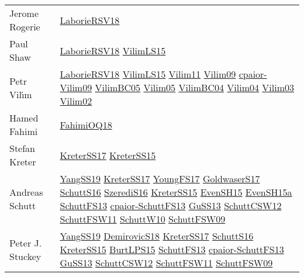 {\begin{longtable}{p{4cm}p{15cm}}
Jerome Rogerie & \href{articles/LaborieRSV18.pdf}{LaborieRSV18}\cite{LaborieRSV18} \\
Paul Shaw & \href{articles/LaborieRSV18.pdf}{LaborieRSV18}\cite{LaborieRSV18} \href{papers/VilimLS15.pdf}{VilimLS15}\cite{VilimLS15} \\
Petr Vil{\'{\i}}m & \href{articles/LaborieRSV18.pdf}{LaborieRSV18}\cite{LaborieRSV18} \href{papers/VilimLS15.pdf}{VilimLS15}\cite{VilimLS15} \href{papers/Vilim11.pdf}{Vilim11}\cite{Vilim11} \href{papers/Vilim09.pdf}{Vilim09}\cite{Vilim09} \href{papers/cpaior-Vilim09.pdf}{cpaior-Vilim09}\cite{cpaior-Vilim09} \href{articles/VilimBC05.pdf}{VilimBC05}\cite{VilimBC05} \href{papers/Vilim05.pdf}{Vilim05}\cite{Vilim05} \href{papers/VilimBC04.pdf}{VilimBC04}\cite{VilimBC04} \href{papers/Vilim04.pdf}{Vilim04}\cite{Vilim04} \href{papers/Vilim03.pdf}{Vilim03}\cite{Vilim03} \href{papers/Vilim02.pdf}{Vilim02}\cite{Vilim02} \\
Hamed Fahimi & \href{articles/FahimiOQ18.pdf}{FahimiOQ18}\cite{FahimiOQ18} \\
Stefan Kreter & \href{articles/KreterSS17.pdf}{KreterSS17}\cite{KreterSS17} \href{papers/KreterSS15.pdf}{KreterSS15}\cite{KreterSS15} \\
Andreas Schutt & \href{papers/YangSS19.pdf}{YangSS19}\cite{YangSS19} \href{articles/KreterSS17.pdf}{KreterSS17}\cite{KreterSS17} \href{papers/YoungFS17.pdf}{YoungFS17}\cite{YoungFS17} \href{papers/GoldwaserS17.pdf}{GoldwaserS17}\cite{GoldwaserS17} \href{papers/SchuttS16.pdf}{SchuttS16}\cite{SchuttS16} \href{papers/SzerediS16.pdf}{SzerediS16}\cite{SzerediS16} \href{papers/KreterSS15.pdf}{KreterSS15}\cite{KreterSS15} \href{papers/EvenSH15.pdf}{EvenSH15}\cite{EvenSH15} \href{articles/EvenSH15a.pdf}{EvenSH15a}\cite{EvenSH15a} \href{papers/SchuttFS13.pdf}{SchuttFS13}\cite{SchuttFS13} \href{papers/cpaior-SchuttFS13.pdf}{cpaior-SchuttFS13}\cite{cpaior-SchuttFS13} \href{papers/GuSS13.pdf}{GuSS13}\cite{GuSS13} \href{papers/SchuttCSW12.pdf}{SchuttCSW12}\cite{SchuttCSW12} \href{articles/SchuttFSW11.pdf}{SchuttFSW11}\cite{SchuttFSW11} \href{papers/SchuttW10.pdf}{SchuttW10}\cite{SchuttW10} \href{papers/SchuttFSW09.pdf}{SchuttFSW09}\cite{SchuttFSW09} \\
Peter J. Stuckey & \href{papers/YangSS19.pdf}{YangSS19}\cite{YangSS19} \href{papers/DemirovicS18.pdf}{DemirovicS18}\cite{DemirovicS18} \href{articles/KreterSS17.pdf}{KreterSS17}\cite{KreterSS17} \href{papers/SchuttS16.pdf}{SchuttS16}\cite{SchuttS16} \href{papers/KreterSS15.pdf}{KreterSS15}\cite{KreterSS15} \href{papers/BurtLPS15.pdf}{BurtLPS15}\cite{BurtLPS15} \href{papers/SchuttFS13.pdf}{SchuttFS13}\cite{SchuttFS13} \href{papers/cpaior-SchuttFS13.pdf}{cpaior-SchuttFS13}\cite{cpaior-SchuttFS13} \href{papers/GuSS13.pdf}{GuSS13}\cite{GuSS13} \href{papers/SchuttCSW12.pdf}{SchuttCSW12}\cite{SchuttCSW12} \href{articles/SchuttFSW11.pdf}{SchuttFSW11}\cite{SchuttFSW11} \href{papers/SchuttFSW09.pdf}{SchuttFSW09}\cite{SchuttFSW09} \\

\end{longtable}}
